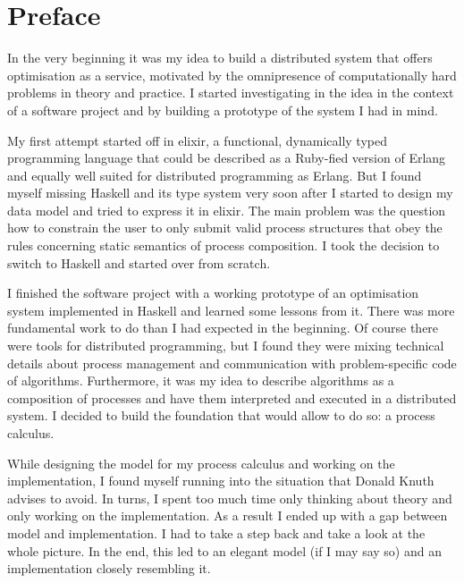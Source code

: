 $\;$
\clearpage
\renewcommand*{\dictumwidth}{.6\textwidth}

\section*{Preface}
In the very beginning it was my idea to build a distributed system that offers optimisation as a service, motivated by the omnipresence of computationally hard problems in theory and practice. I started investigating in the idea in the context of a software project and by building a prototype of the system I had in mind.

My first attempt started off in \textsf{elixir}, a functional, dynamically typed programming language that could be described as a \textsf{Ruby}-fied version of \textsf{Erlang} and equally well suited for distributed programming as \textsf{Erlang}. But I found myself missing \textsf{Haskell} and its type system very soon after I started to design my data model and tried to express it in \textsf{elixir}. The main problem was the question how to constrain the user to only submit valid process structures that obey the rules concerning static semantics of process composition. I took the decision to switch to \textsf{Haskell} and started over from scratch.

I finished the software project with a working prototype of an optimisation system implemented in \textsf{Haskell} and learned some lessons from it. There was more fundamental work to do than I had expected in the beginning. Of course there were tools for distributed programming, but I found they were mixing technical details about process management and communication with problem-specific code of algorithms. Furthermore, it was my idea to describe algorithms as a composition of processes and have them interpreted and executed in a distributed system. I decided to build the foundation that would allow to do so: a process calculus.

While designing the model for my process calculus and working on the implementation, I found myself running into the situation that Donald Knuth advises to avoid. In turns, I spent too much time only thinking about theory and only working on the implementation. As a result I ended up with a gap between model and implementation. I had to take a step back and take a look at the whole picture. In the end, this led to an elegant model (if I may say so) and an implementation closely resembling it.

